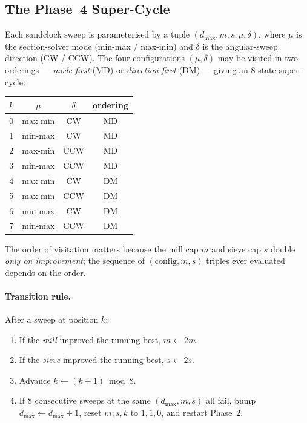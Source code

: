 \documentclass[11pt,a4paper]{article}
\begin{document}
\subsection{The Phase~4 Super-Cycle}

Each sandclock sweep is parameterised by a tuple
$(d_{\max}, m, s, \mu, \delta)$, where $\mu$ is the section-solver mode
(min-max / max-min) and $\delta$ is the angular-sweep direction
(CW / CCW). The four configurations $(\mu, \delta)$ may be visited in
two orderings --- \emph{mode-first} (MD) or \emph{direction-first} (DM)
--- giving an 8-state super-cycle:

\begin{center}
\begin{tabular}{cccc}
\toprule
$k$ & $\mu$ & $\delta$ & ordering \\
\midrule
0 & max-min & CW  & MD \\
1 & min-max & CW  & MD \\
2 & max-min & CCW & MD \\
3 & min-max & CCW & MD \\
4 & max-min & CW  & DM \\
5 & max-min & CCW & DM \\
6 & min-max & CW  & DM \\
7 & min-max & CCW & DM \\
\bottomrule
\end{tabular}
\end{center}

The order of visitation matters because the mill cap $m$ and sieve cap
$s$ double \emph{only on improvement}; the sequence of $(\text{config},
m, s)$ triples ever evaluated depends on the order.

\paragraph{Transition rule.} After a sweep at position $k$:
\begin{enumerate}
\item If the \emph{mill} improved the running best, $m \leftarrow 2m$.
\item If the \emph{sieve} improved the running best, $s \leftarrow 2s$.
\item Advance $k \leftarrow (k+1) \bmod 8$.
\item If 8 consecutive sweeps at the same $(d_{\max}, m, s)$ all fail,
bump $d_{\max} \leftarrow d_{\max} + 1$, reset $m, s, k$ to $1, 1, 0$,
and restart Phase~2.
\end{enumerate}
\end{document}
